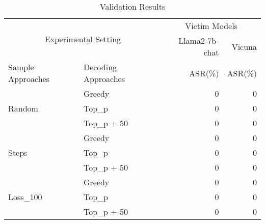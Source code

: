 \begin{table}[H]\centering
\caption{Validation Results}\label{tab: }
\scriptsize
\begin{tabular}{llrr}\toprule
\multicolumn{2}{c}{\multirow{2}{*}{Experimental Setting}} &\multicolumn{2}{c}{Victim Models} \\
\cmidrule{3-4}
& &Llama2-7b-chat &Vicuna \\
\midrule
Sample Approaches &Decoding Approaches &ASR(\%) &ASR(\%) \\
\midrule
\multirow{3}{*}{Random} &Greedy &0 &0 \\
&Top\_p &0 &0 \\
&Top\_p + 50 &0 &0 \\
\cmidrule{1-4}
\multirow{3}{*}{Steps} &Greedy &0 &0 \\
&Top\_p &0 &0 \\
&Top\_p + 50 &0 &0 \\
\cmidrule{1-4}
\multirow{3}{*}{Loss\_100} &Greedy &0 &0 \\
&Top\_p &0 &0 \\
&Top\_p + 50 &0 &0 \\
\bottomrule
\end{tabular}
\end{table}